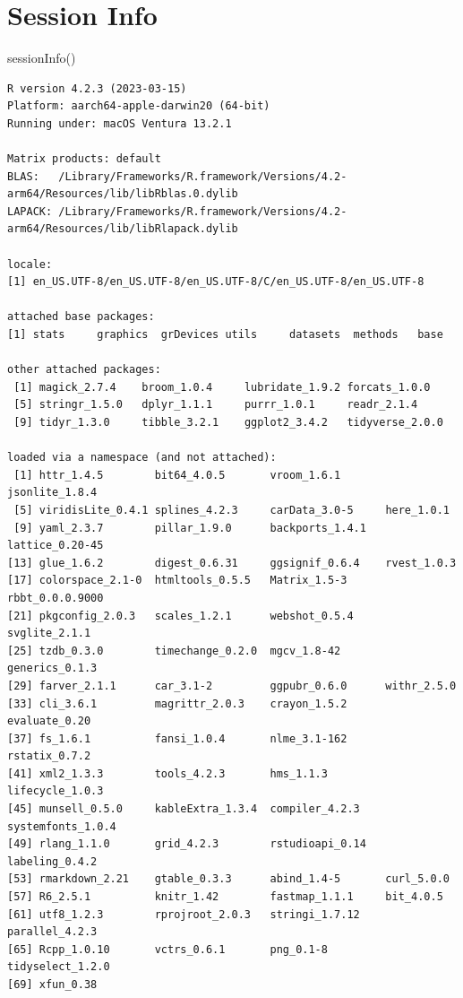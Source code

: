 \documentclass[
  letterpaper,
  DIV=11,
  numbers=noendperiod]{scrartcl}
\newenvironment{Shaded}{\begin{snugshade}}{\end{snugshade}}
\newcommand{\FunctionTok}[1]{\textcolor[rgb]{0.28,0.35,0.67}{#1}}
\newcommand{\NormalTok}[1]{\textcolor[rgb]{0.00,0.23,0.31}{#1}}
\begin{document}
\hypertarget{session-info}{%
\section*{Session Info}\label{session-info}}

\begin{Shaded}
\begin{Highlighting}[]
\FunctionTok{sessionInfo}\NormalTok{()}
\end{Highlighting}
\end{Shaded}

\begin{verbatim}
R version 4.2.3 (2023-03-15)
Platform: aarch64-apple-darwin20 (64-bit)
Running under: macOS Ventura 13.2.1

Matrix products: default
BLAS:   /Library/Frameworks/R.framework/Versions/4.2-arm64/Resources/lib/libRblas.0.dylib
LAPACK: /Library/Frameworks/R.framework/Versions/4.2-arm64/Resources/lib/libRlapack.dylib

locale:
[1] en_US.UTF-8/en_US.UTF-8/en_US.UTF-8/C/en_US.UTF-8/en_US.UTF-8

attached base packages:
[1] stats     graphics  grDevices utils     datasets  methods   base     

other attached packages:
 [1] magick_2.7.4    broom_1.0.4     lubridate_1.9.2 forcats_1.0.0  
 [5] stringr_1.5.0   dplyr_1.1.1     purrr_1.0.1     readr_2.1.4    
 [9] tidyr_1.3.0     tibble_3.2.1    ggplot2_3.4.2   tidyverse_2.0.0

loaded via a namespace (and not attached):
 [1] httr_1.4.5        bit64_4.0.5       vroom_1.6.1       jsonlite_1.8.4   
 [5] viridisLite_0.4.1 splines_4.2.3     carData_3.0-5     here_1.0.1       
 [9] yaml_2.3.7        pillar_1.9.0      backports_1.4.1   lattice_0.20-45  
[13] glue_1.6.2        digest_0.6.31     ggsignif_0.6.4    rvest_1.0.3      
[17] colorspace_2.1-0  htmltools_0.5.5   Matrix_1.5-3      rbbt_0.0.0.9000  
[21] pkgconfig_2.0.3   scales_1.2.1      webshot_0.5.4     svglite_2.1.1    
[25] tzdb_0.3.0        timechange_0.2.0  mgcv_1.8-42       generics_0.1.3   
[29] farver_2.1.1      car_3.1-2         ggpubr_0.6.0      withr_2.5.0      
[33] cli_3.6.1         magrittr_2.0.3    crayon_1.5.2      evaluate_0.20    
[37] fs_1.6.1          fansi_1.0.4       nlme_3.1-162      rstatix_0.7.2    
[41] xml2_1.3.3        tools_4.2.3       hms_1.1.3         lifecycle_1.0.3  
[45] munsell_0.5.0     kableExtra_1.3.4  compiler_4.2.3    systemfonts_1.0.4
[49] rlang_1.1.0       grid_4.2.3        rstudioapi_0.14   labeling_0.4.2   
[53] rmarkdown_2.21    gtable_0.3.3      abind_1.4-5       curl_5.0.0       
[57] R6_2.5.1          knitr_1.42        fastmap_1.1.1     bit_4.0.5        
[61] utf8_1.2.3        rprojroot_2.0.3   stringi_1.7.12    parallel_4.2.3   
[65] Rcpp_1.0.10       vctrs_0.6.1       png_0.1-8         tidyselect_1.2.0 
[69] xfun_0.38        
\end{verbatim}
\end{document}

